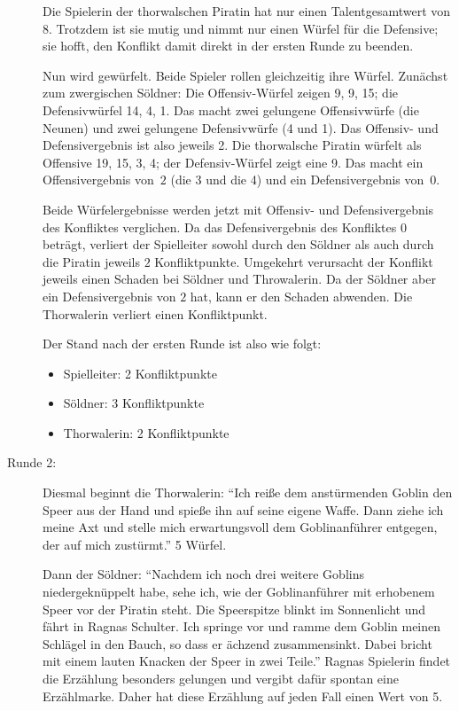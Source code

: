 \begin{beispiel}
\begin{description}
Die Spielerin der thorwalschen Piratin hat nur einen Talentgesamtwert von $8$. Trotzdem ist sie mutig und nimmt nur einen Würfel für die Defensive; sie hofft, den Konflikt damit direkt in der ersten Runde zu beenden.

Nun wird gewürfelt. Beide Spieler rollen gleichzeitig ihre Würfel. Zunächst zum zwergischen Söldner: Die Offensiv-Würfel zeigen 9, 9, 15; die Defensivwürfel 14, 4, 1. Das macht zwei gelungene Offensivwürfe (die Neunen) und zwei gelungene Defensivwürfe (4 und 1). Das Offensiv- und Defensivergebnis ist also jeweils 2. Die thorwalsche Piratin würfelt als Offensive 19, 15, 3, 4; der Defensiv-Würfel zeigt eine 9. Das macht ein Offensivergebnis von~$2$ (die 3 und die 4) und ein Defensivergebnis von~$0$.

Beide Würfelergebnisse werden jetzt mit Offensiv- und Defensivergebnis des Konfliktes verglichen. Da das Defensivergebnis des Konfliktes $0$ beträgt, verliert der Spielleiter sowohl durch den Söldner als auch durch die Piratin jeweils $2$ Konfliktpunkte. Umgekehrt verursacht der Konflikt jeweils einen Schaden bei Söldner und Throwalerin. Da der Söldner aber ein Defensivergebnis von $2$ hat, kann er den Schaden abwenden. Die Thorwalerin
verliert einen Konfliktpunkt.

Der Stand nach der ersten Runde ist also wie folgt:
\begin{itemize}
\item Spielleiter: 2 Konfliktpunkte
\item Söldner: 3 Konfliktpunkte
\item Thorwalerin: 2 Konfliktpunkte
\end{itemize}

\item[Runde 2:] Diesmal beginnt die Thorwalerin: ``Ich reiße dem anstürmenden Goblin den Speer aus der Hand und spieße ihn auf seine eigene Waffe. Dann ziehe ich meine Axt und stelle mich erwartungsvoll dem Goblinanführer entgegen, der auf mich zustürmt.'' 5 Würfel.

Dann der Söldner: ``Nachdem ich noch drei weitere Goblins niedergeknüppelt habe, sehe ich, wie der Goblinanführer mit erhobenem Speer vor der Piratin steht. Die Speerspitze blinkt im Sonnenlicht und fährt in Ragnas Schulter. Ich springe vor und ramme dem Goblin meinen Schlägel in den Bauch, so dass er ächzend zusammensinkt. Dabei bricht mit einem lauten Knacken der Speer in zwei Teile.'' Ragnas Spielerin findet die Erzählung besonders gelungen und vergibt dafür spontan eine Erzählmarke. Daher hat diese Erzählung auf jeden Fall einen Wert von 5.


\end{description}
\end{beispiel}
